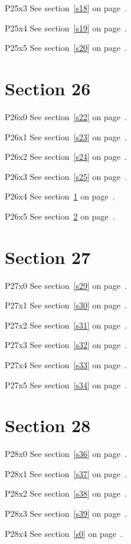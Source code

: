 P25x3 \w\w\w\w\w\w See section~\ref{s18} on page~\pageref{s38}.

P25x4 \w\w\w\w\w\w See section~\ref{s19} on page~\pageref{s39}.

P25x5 \w\w\w\w\w\w See section~\ref{s20} on page~\pageref{s0}.

\section{Section 26}\label{s26}
P26x0 \w\w\w\w\w\w See section~\ref{s22} on page~\pageref{s38}.

P26x1 \w\w\w\w\w\w See section~\ref{s23} on page~\pageref{s39}.

P26x2 \w\w\w\w\w\w See section~\ref{s24} on page~\pageref{s0}.

P26x3 \w\w\w\w\w\w See section~\ref{s25} on page~\pageref{s1}.

P26x4 \w\w\w\w\w\w See section~\ref{s26} on page~\pageref{s2}.

P26x5 \w\w\w\w\w\w See section~\ref{s27} on page~\pageref{s3}.

\section{Section 27}\label{s27}
P27x0 \w\w\w\w\w\w See section~\ref{s29} on page~\pageref{s1}.

P27x1 \w\w\w\w\w\w See section~\ref{s30} on page~\pageref{s2}.

P27x2 \w\w\w\w\w\w See section~\ref{s31} on page~\pageref{s3}.

P27x3 \w\w\w\w\w\w See section~\ref{s32} on page~\pageref{s4}.

P27x4 \w\w\w\w\w\w See section~\ref{s33} on page~\pageref{s5}.

P27x5 \w\w\w\w\w\w See section~\ref{s34} on page~\pageref{s6}.

\section{Section 28}\label{s28}
P28x0 \w\w\w\w\w\w See section~\ref{s36} on page~\pageref{s4}.

P28x1 \w\w\w\w\w\w See section~\ref{s37} on page~\pageref{s5}.

P28x2 \w\w\w\w\w\w See section~\ref{s38} on page~\pageref{s6}.

P28x3 \w\w\w\w\w\w See section~\ref{s39} on page~\pageref{s7}.

P28x4 \w\w\w\w\w\w See section~\ref{s0} on page~\pageref{s8}.

